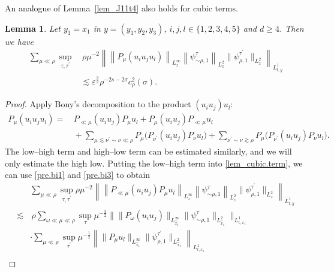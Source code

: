 \documentclass[11pt,letterpaper,reqno]{amsart}
\numberwithin{equation}{section}
\newtheorem{lemma}[theorem]{Lemma}
\theoremstyle{definition}
\theoremstyle{remark}
\begin{document}
An analogue of Lemma~\ref{lem_J11t4} also holds for cubic terms.	
     \begin{lemma}  \label{lem_cubic.term}
 	Let \(y_1=x_1\) in \(y=(y_1,y_2,y_3)\), $ i,j,l\in\{1,2,3,4,5\} $ and \(d \geq 4\). Then we have
	\begin{align}
		\sum_{\mu\ll\rho}	 	\sup_{\tau, \tau^\prime } &\,\rho \mu^{-2}\left\| \left\| 	P_{\mu} \left(u_i u_j u_l \right)\right\|_{L^\infty_z} \left\|     \psi_{\sim\rho ,1}^{\tau } \right\|_{L^2_z}    \|   \psi_{\rho,1} ^{\tau^\prime} \|_{L^2_z}     \right\|_{L^1_{t,y}}\nonumber \\
			 \label{Rem_estJ11t4} & \lesssim   \varepsilon^{\frac 32} \rho^{-2s -2\sigma}  c_{\rho }^2 (\sigma).
	\end{align}
 \end{lemma}
\begin{proof}
   Apply Bony's decomposition to the product \((u_i u_j)u_l\):
 \begin{align}  \label{cubic.bony}
     P_{\mu} \left(u_i u_j u_l \right)  
=&\, P_{\ll\mu}   (u_i   u_j) P_{    \mu} u_l+    P_{\mu} (u_i   u_j) P_{   \ll \mu} u_l\\
&\,+\sum_{ \mu \lesssim \nu^\prime \sim \nu  \ll \rho}P_\mu \big(P_{\nu^\prime } (u_i u_j )P_{\nu}   u_l\big)+\sum_{ \nu^\prime \sim \nu \gtrsim\rho}P_\mu \big(P_{\nu^\prime } (u_i u_j )P_{\nu}   u_l\big).\nonumber
 \end{align}
The low--high term and high--low term can be estimated  similarly, and we will only estimate the high low.  Putting the   low--high term into \eqref{lem_cubic.term}, we can use \eqref{pre.bi1} and \eqref{pre.bi3} to obtain
\begin{align*}
  &  \sum_{\mu\ll\rho}	 	\sup_{\tau, \tau^\prime }  \rho \mu^{-2}\left\| \left\| 	 P_{\ll\mu}   (u_i   u_j) P_{    \mu} u_l\right\|_{L^\infty_z} \left\|     \psi_{\sim\rho ,1}^{\tau } \right\|_{L^2_z}    \|   \psi_{\rho,1} ^{\tau^\prime} \|_{L^2_z}     \right\|_{L^1_{t,y}}\nonumber \\
  \lesssim&\, \rho  \sum_{\omega \ll\mu\ll\rho}	 	\sup_{\tau  }    \mu^{-\frac 32}\big\|  \| 	 P_{\omega}   (u_i   u_j)   \|_{L^\infty_{\widehat{x}_1}}  \|     \psi_{\sim\rho ,1}^{\tau }  \|_{L^2_{\widehat{x}_1}}        \big\|_{L^1_{t,x_1}} \\
  &\cdot \sum_{\mu\ll\rho}	 	\sup_{ \tau^\prime }   \mu^{-\frac 12}\left\|  \| 	P_{\mu}  u_l   \|_{L^\infty_{ \widehat{x}_1}}       \|   \psi_{\rho,1} ^{\tau^\prime} \|_{L^2_{\widehat{x}_1}}     \right\|_{L^1_{t,x_1}}\nonumber \\

\end{align*}
\end{proof}
\end{document}
